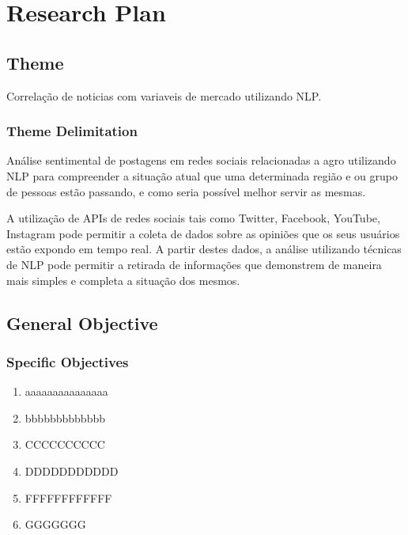 \chapter{Research Plan} \label{chap:ResearchPlan}




\section{Theme} \label{sec::Theme}

    Correlação de noticias com variaveis de mercado utilizando NLP.

\subsection{Theme Delimitation} \label{subsec::ThemeDelimitation}

   Análise sentimental de postagens em redes sociais relacionadas a agro utilizando NLP para compreender a situação atual que uma determinada região e ou grupo de pessoas estão passando, e como seria possível melhor servir as mesmas.
    
    A utilização de APIs de redes sociais tais como Twitter, Facebook, YouTube, Instagram pode permitir a coleta de dados sobre as opiniões que os seus usuários estão expondo em tempo real. A partir destes dados, a análise utilizando técnicas de NLP pode permitir a retirada de informações que demonstrem de maneira mais simples e completa a situação dos mesmos.

\lipsum[2-3]

\section{General Objective} \label{sec:objective}


\subsection{Specific Objectives}
\begin{enumerate}
    \item aaaaaaaaaaaaaaa
    \item bbbbbbbbbbbbb
    \item CCCCCCCCCC
    \item DDDDDDDDDDD
    \item FFFFFFFFFFFF
    \item GGGGGGG
\end{enumerate}


